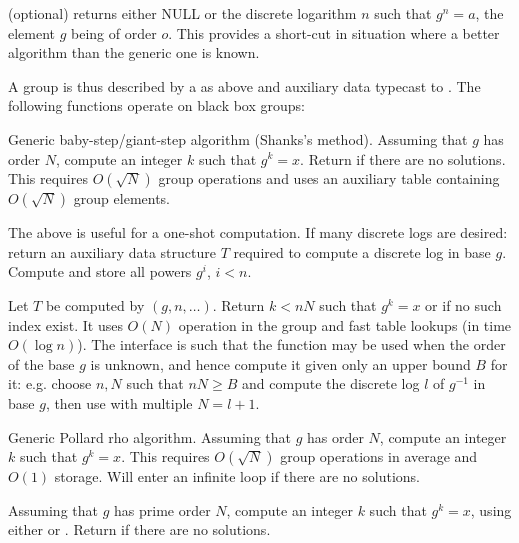  (optional) returns either NULL or the discrete logarithm
$n$ such that $g^n=a$, the element $g$ being of order $o$. This provides a
short-cut in situation where a better algorithm than the generic one is known.

A group is thus described by a  as above and auxiliary
data typecast to . The following functions operate on black box
groups:

 \break
Generic baby-step/giant-step algorithm (Shanks's method). Assuming
that $g$ has order $N$, compute an integer $k$ such that $g^k = x$.
Return  if there are no solutions. This requires
$O(\sqrt{N})$ group operations and uses an auxiliary table containing
$O(\sqrt{N})$ group elements.

The above is useful for a one-shot computation. If many discrete logs
are desired:
return an auxiliary data structure $T$ required to compute a discrete log in
base $g$. Compute and store all powers $g^i$,  $i < n$.

Let $T$ be computed by $(g,n,\dots)$.
Return $k < n N$ such that  $g^k = x$ or  if no such index exist.
It uses $O(N)$ operation in the group and fast table lookups  (in time
$O(\log n)$). The interface is such that the function may be used when the
order of the base $g$ is unknown, and hence compute it given only an upper
bound $B$ for it: e.g. choose $n,N$ such that $nN \geq B$ and compute the
discrete log $l$ of $g^{-1}$ in base $g$, then use 
with multiple $N = l+1$.

 \break
Generic Pollard rho algorithm. Assuming that $g$ has order $N$, compute an
integer $k$ such that $g^k = x$. This requires $O(\sqrt{N})$ group operations
in average and $O(1)$ storage. Will enter an infinite loop if there are no
solutions.

Assuming that $g$ has prime order $N$, compute an integer $k$ such that
$g^k = x$, using either  or .
Return  if there are no solutions.


